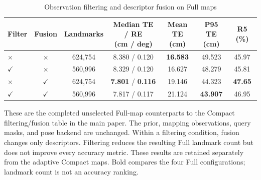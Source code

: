 \begin{table}[tp]
\centering
\footnotesize
\setlength{\tabcolsep}{4pt}
\renewcommand{\arraystretch}{1.12}
\caption{Observation filtering and descriptor fusion on Full maps}
\label{tab:s_t6_full}
\begin{tabular}{lcccccc}
\toprule
Filter & Fusion & Landmarks & \shortstack{Median TE / RE\\(cm / deg)} & \shortstack{Mean TE\\(cm)} & \shortstack{P95 TE\\(cm)} & R5 (\%) \\
\midrule
$\times$ & $\times$ & 624,754 & 8.380 / 0.120 & \textbf{16.583} & 49.523 & 45.97 \\
$\checkmark$ & $\times$ & 560,996 & 8.329 / 0.120 & 16.627 & 48.279 & 45.81 \\
$\times$ & $\checkmark$ & 624,754 & \textbf{7.801} / \textbf{0.116} & 19.146 & 44.323 & \textbf{47.65} \\
$\checkmark$ & $\checkmark$ & 560,996 & 7.817 / 0.117 & 21.124 & \textbf{43.907} & 46.95 \\
\bottomrule
\end{tabular}
\par\smallskip\begin{minipage}{0.98\linewidth}\footnotesize These are the completed unselected Full-map counterparts to the Compact filtering/fusion table in the main paper. The prior, mapping observations, query masks, and pose backend are unchanged. Within a filtering condition, fusion changes only descriptors. Filtering reduces the resulting Full landmark count but does not improve every accuracy metric. These results are retained separately from the adaptive Compact maps. Bold compares the four Full configurations; landmark count is not an accuracy ranking.\end{minipage}
\end{table}
